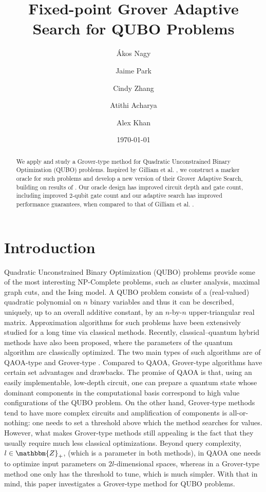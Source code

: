\documentclass[reqno, 10pt]{amsart}
\title{Fixed-point Grover Adaptive Search for QUBO Problems}
\date{\today}
\author{\'Akos Nagy}
\author{Jaime Park}
\author{Cindy Zhang}
\author{Atithi Acharya}
\author{Alex Khan}
\numberwithin{equation}{section}                     %
\def\Z{\mathbbm{Z}}
\begin{document}
\begin{abstract}
    We apply and study a Grover-type method for Quadratic Unconstrained Binary Optimization (QUBO) problems. Inspired by Gilliam et al. \cite{gilliam_grover_2021}, we construct a marker oracle for such problems and develop a new version of their Grover Adaptive Search, building on results of \cites{yoder_fixed_2014,li_quantum_2019}. Our oracle design has improved circuit depth and gate count, including improved $2$-qubit gate count and our adaptive search has improved performance guarantees, when compared to that of Gilliam et al. \cite{gilliam_grover_2021}.
\end{abstract}

\maketitle

\section{Introduction}

Quadratic Unconstrained Binary Optimization (QUBO) problems provide some of the most interesting NP-Complete problems, such as cluster analysis, maximal graph cuts, and the Ising model. A QUBO problem consists of a (real-valued) quadratic polynomial on $n$ binary variables and thus it can be described, uniquely, up to an overall additive constant, by an $n$-by-$n$ upper-triangular real matrix. Approximation algorithms for such problems have been extensively studied for a long time via classical methods. Recently, classical--quantum hybrid methods have also been proposed, where the parameters of the quantum algorithm are classically optimized. The two main types of such algorithms are of QAOA-type \cites{farhi_quantum_2014,szegedy_qaoa_2019,bartschi_grover_2020,golden_threshold_2021} and Grover-type \cite{gilliam_grover_2021}. Compared to QAOA, Grover-type algorithms have certain set advantages and drawbacks. The promise of QAOA is that, using an easily implementable, low-depth circuit, one can prepare a quantum state whose dominant components in the computational basis correspond to high value configurations of the QUBO problem. On the other hand, Grover-type methods tend to have more complex circuits and amplification of components is all-or-nothing: one needs to set a threshold above which the method searches for values. However, what makes Grover-type methods still appealing is the fact that they usually require much less classical optimizations. Beyond query complexity, $l \in \Z_+$, (which is a parameter in both methods), in QAOA one needs to optimize input parameters on $2 l$-dimensional spaces, whereas in a Grover-type method one only has the threshold to tune, which is much simpler. With that in mind, this paper investigates a Grover-type method for QUBO problems.
\end{document}
